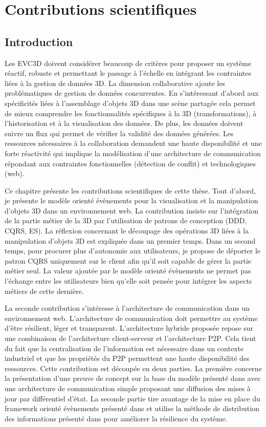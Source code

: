 \chapter{Contributions scientifiques}
\chaptertable
\section{Introduction}
Les \gls{EVC3D} doivent considérer beaucoup de critères pour 
proposer un système réactif, robuste et permettant le passage à l'échelle en 
intégrant les contraintes liées à la gestion de données 3D. La dimension 
collaborative ajoute les problématiques de gestion de données concurrentes.
En s'intéressant d'abord aux spécificités liées à 
l'assemblage d'objets 3D dans une scène partagée cela permet de 
mieux comprendre les fonctionnalités spécifiques à la 3D (transformations), 
à l'historisation et à la visualisation des données. De plus, les données 
doivent suivre un flux qui permet de vérifier la validité des données générées.
Les ressources nécessaires à la collaboration demandent une haute disponibilité 
et une forte réactivité qui implique la modélisation d'une architecture 
de communication répondant aux contraintes fonctionnelles (détection de conflit) 
et technologiques (web).

Ce chapitre présente les contributions scientifiques de cette thèse.
Tout d'abord, je présente le modèle orienté évènements pour la 
visualisation et la manipulation d'objets 3D dans un environnement web. La 
contribution insiste sur l'intégration de la partie métier de la 3D par l'utilisation de 
patrons de conception (\gls{DDD}, \gls{CQRS}, \gls{ES}). La réflexion concernant 
le découpage des opérations 3D liées à la manipulation d'objets 3D est expliquée 
dans un premier temps. Dans un second temps, pour procurer plus d'autonomie 
aux utilisateurs, je propose de déporter le patron \gls{CQRS} uniquement sur le 
client afin qu'il soit capable de gérer la partie métier seul. La valeur ajoutée par le 
modèle orienté évènements ne permet pas l'échange entre les utilisateurs bien 
qu'elle soit pensée pour intégrer les aspects métiers de cette dernière. 

La seconde contribution s'intéresse à l'architecture de 
communication dans un environnement web. L'architecture de communication doit 
permettre au système d'être résilient, léger et transparent. 
L'architecture hybride proposée repose sur une combinaison de l'architecture 
client-serveur et l'architecture \gls{P2P}. 
Cela tient du fait que la centralisation de l'information est nécessaire dans un 
contexte industriel et que les propriétés du \gls{P2P} permettent une haute disponibilité 
des ressources. Cette contribution est découpée en deux parties. La première 
concerne la présentation d'une preuve de concept sur la base du modèle présenté 
dans \cite{Desprat2015a} avec une architecture de communication simple 
proposant une diffusion des mises à jour par différentiel d'état. La seconde partie 
tire avantage de la mise en place du \gls{framework} orienté évènements présenté dans 
\cite{Desprat2016} et utilise la méthode de distribution des informations présenté 
dans \cite{Desprat2017} pour améliorer la résilience du système. 

